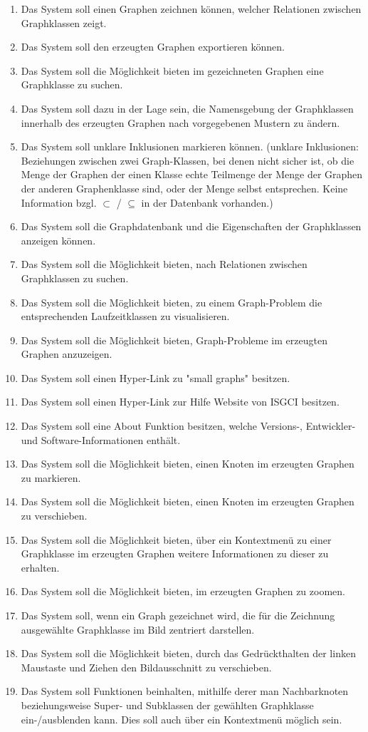 \documentclass[10pt,a4paper]{article}
\begin{document}
	\begin{enumerate}[leftmargin=.9cm]
\item Das System soll einen Graphen zeichnen können, welcher Relationen zwischen Graphklassen zeigt.
\item Das System soll den erzeugten Graphen exportieren können.
\item Das System soll die Möglichkeit bieten im gezeichneten Graphen eine Graphklasse zu suchen. 
\item Das System soll dazu in der Lage sein, die Namensgebung der Graphklassen innerhalb des erzeugten Graphen nach vorgegebenen Mustern zu ändern.
\item Das System soll unklare Inklusionen markieren können. (unklare Inklusionen: Beziehungen zwischen zwei Graph-Klassen, bei denen nicht sicher ist, ob die Menge der Graphen der einen Klasse echte Teilmenge der Menge der Graphen der anderen Graphenklasse sind, oder der Menge selbst entsprechen. Keine Information bzgl. $\subset$ / $\subseteq$ in der Datenbank vorhanden.)
\item Das System soll die Graphdatenbank und die Eigenschaften der Graphklassen anzeigen können. 
\item Das System soll die Möglichkeit bieten, nach Relationen zwischen Graphklassen zu suchen.
\item Das System soll die Möglichkeit bieten, zu einem Graph-Problem die entsprechenden Laufzeitklassen zu visualisieren.
\item Das System soll die Möglichkeit bieten, Graph-Probleme im erzeugten Graphen anzuzeigen.
\item Das System soll einen Hyper-Link zu "small graphs" besitzen.
\item Das System soll einen Hyper-Link zur Hilfe Website von ISGCI besitzen.
\item Das System soll eine About Funktion besitzen, welche Versions-, Entwickler- und Software-Informationen enthält.
\item Das System soll die Möglichkeit bieten, einen Knoten im erzeugten Graphen zu markieren.
\item Das System soll die Möglichkeit bieten, einen Knoten im erzeugten Graphen zu verschieben.
\item Das System soll die Möglichkeit bieten, über ein Kontextmenü zu einer Graphklasse im erzeugten Graphen weitere Informationen zu dieser zu erhalten.
\item Das System soll die Möglichkeit bieten, im erzeugten Graphen zu zoomen.
\item Das System soll, wenn ein Graph gezeichnet wird, die für die Zeichnung ausgewählte Graphklasse im Bild zentriert darstellen.
\item Das System soll die Möglichkeit bieten, durch das Gedrückthalten der linken Maustaste und Ziehen den Bildausschnitt zu verschieben.
\item Das System soll Funktionen beinhalten, mithilfe derer man Nachbarknoten beziehungsweise Super- und Subklassen der gewählten Graphklasse ein-/ausblenden kann. Dies soll auch über ein Kontextmenü möglich sein.



\end{enumerate}
\end{document}
